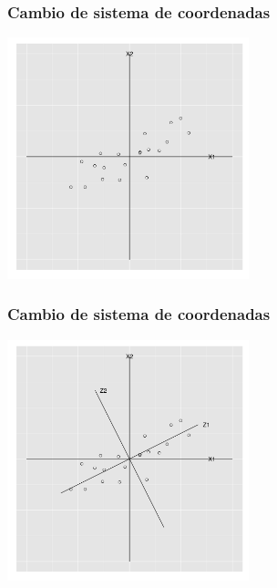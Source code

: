 \documentclass{beamer}
\begin{document}
 \begin{frame}\frametitle{Cambio de sistema de coordenadas}
   \begin{overlayarea}{\textwidth}{8cm} 
 \begin{center}
   \includegraphics[height=7cm]{x1x2z1z2rotated00.png}
 \end{center}
   \end{overlayarea}
 \end{frame}
\begin{frame}\frametitle{Cambio de sistema de coordenadas}
   \begin{overlayarea}{\textwidth}{8cm} 
 \begin{center}
   \includegraphics[height=7cm]{x1x2z1z2rotated01.png}
 \end{center}
   \end{overlayarea}
 \end{frame}
\end{document}
